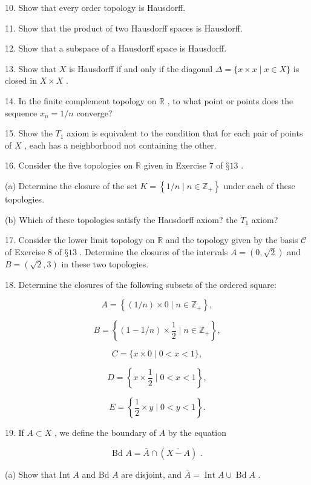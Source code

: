 10. Show that every order topology is Hausdorff.

11. Show that the product of two Hausdorff spaces is Hausdorff.

12. Show that a subspace of a Hausdorff space is Hausdorff.

13. Show that \(X\) is Hausdorff if and only if the diagonal \(\Delta  = \{ x \times  x \mid  x \in  X\}\) is closed in \(X \times  X\) .

14. In the finite complement topology on \(\mathbb{R}\) , to what point or points does the sequence \({x}_{n} = 1/n\) converge?

15. Show the \({T}_{1}\) axiom is equivalent to the condition that for each pair of points of \(X\) , each has a neighborhood not containing the other.

16. Consider the five topologies on \(\mathbb{R}\) given in Exercise 7 of \(§{13}\) .

(a) Determine the closure of the set \(K = \left\{  {1/n \mid  n \in  {\mathbb{Z}}_{ + }}\right\}\) under each of these topologies.

(b) Which of these topologies satisfy the Hausdorff axiom? the \({T}_{1}\) axiom?

17. Consider the lower limit topology on \(\mathbb{R}\) and the topology given by the basis \(\mathcal{C}\) of Exercise 8 of \(§{13}\) . Determine the closures of the intervals \(A = \left( {0,\sqrt{2}}\right)\) and \(B = \left( {\sqrt{2},3}\right)\) in these two topologies.

18. Determine the closures of the following subsets of the ordered square:

\[
A = \left\{  {\left( {1/n}\right)  \times  0 \mid  n \in  {\mathbb{Z}}_{ + }}\right\}  ,
\]

\[
B = \left\{  {\left( {1 - 1/n}\right)  \times  \frac{1}{2} \mid  n \in  {\mathbb{Z}}_{ + }}\right\}  ,
\]

\[
C = \{ x \times  0 \mid  0 < x < 1\} ,
\]

\[
D = \left\{  {x \times  \frac{1}{2} \mid  0 < x < 1}\right\}  ,
\]

\[
E = \left\{  {\frac{1}{2} \times  y \mid  0 < y < 1}\right\}  .
\]

19. If \(A \subset  X\) , we define the boundary of \(A\) by the equation

\[
\text{ Bd }A = \bar{A} \cap  \left( \overline{X - A}\right) \text{ . }
\]

(a) Show that Int \(A\) and Bd \(A\) are disjoint, and \(\bar{A} = \operatorname{Int}A \cup  \operatorname{Bd}A\) .

